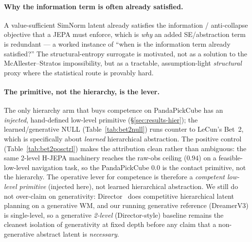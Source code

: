 \documentclass{article}
\begin{document}
\paragraph{Why the information term is often already satisfied.}
A value-sufficient SimNorm latent already satisfies the information / anti-collapse
objective that a JEPA must enforce, which is \emph{why} an added SE/abstraction
term is redundant --- a worked instance of ``when is the information term already
satisfied?'' The structural-entropy surrogate is motivated, not as a solution to
the McAllester--Stratos impossibility, but as a tractable, assumption-light
\emph{structural} proxy where the statistical route is provably hard.

\paragraph{The primitive, not the hierarchy, is the lever.}
The only hierarchy arm that buys competence on PandaPickCube has an \emph{injected},
hand-defined low-level primitive (\S\ref{sec:results-hier}); the learned/generative
NULL (Table~\ref{tab:bet2null}) runs counter to LeCun's Bet~2, which is specifically
about \emph{learned} hierarchical abstraction. The positive control
(Table~\ref{tab:bet2posctrl}) makes the attribution clean rather than ambiguous:
the same 2-level H-JEPA machinery reaches the raw-obs ceiling ($0.94$) on a
feasible-low-level navigation task, so the PandaPickCube $0.0$ is the contact
primitive, not the hierarchy. The operative lever for competence is therefore a
\emph{competent low-level primitive} (injected here), not learned hierarchical
abstraction. We still do not over-claim on generativity:
Director~\citep{hafner2022director} does competitive hierarchical latent planning on
a generative WM, and our running generative reference (DreamerV3) is single-level,
so a generative \emph{2-level} (Director-style) baseline remains the cleanest
isolation of generativity at fixed depth before any claim that a non-generative
abstract latent is \emph{necessary}.
\end{document}
